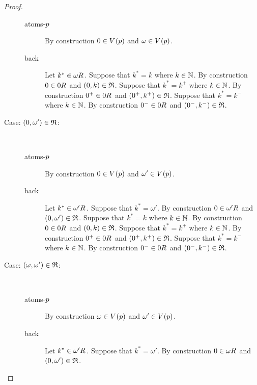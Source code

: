 \begin{proof}
\begin{description}
\begin{description}
            \item[atoms-$p$]
                By construction $0 \in \kValuation(\atomP)$ and $\omega \in \kValuation(\atomP)$.
            \item[back]
                Let $k^* \in \kSuccessors{}{\omega}$.
                Suppose that $k^* = k$ where $k \in \mathbb{N}$.
                By construction $0 \in \kSuccessors{}{0}$ and $(0, k) \in \mathfrak{R}$.
                Suppose that $k^* = k^+$ where $k \in \mathbb{N}$.
                By construction $0^+ \in \kSuccessors{}{0}$ and $(0^+, k^+) \in \mathfrak{R}$.
                Suppose that $k^* = k^-$ where $k \in \mathbb{N}$.
                By construction $0^- \in \kSuccessors{}{0}$ and $(0^-, k^-) \in \mathfrak{R}$.
        \end{description}
    \item[Case: $(0, \omega') \in \mathfrak{R}$:]\hfill\\
        \begin{description}
            \item[atoms-$p$]
                By construction $0 \in \kValuation(\atomP)$ and $\omega' \in \kValuation(\atomP)$.
            \item[back]
                Let $k^* \in \kSuccessors{}{\omega'}$.
                Suppose that $k^* = \omega'$.
                By construction $0 \in \kSuccessors{}{\omega'}$ and $(0, \omega') \in \mathfrak{R}$.
                Suppose that $k^* = k$ where $k \in \mathbb{N}$.
                By construction $0 \in \kSuccessors{}{0}$ and $(0, k) \in \mathfrak{R}$.
                Suppose that $k^* = k^+$ where $k \in \mathbb{N}$.
                By construction $0^+ \in \kSuccessors{}{0}$ and $(0^+, k^+) \in \mathfrak{R}$.
                Suppose that $k^* = k^-$ where $k \in \mathbb{N}$.
                By construction $0^- \in \kSuccessors{}{0}$ and $(0^-, k^-) \in \mathfrak{R}$.
        \end{description}
    \item[Case: $(\omega, \omega') \in \mathfrak{R}$:]\hfill\\
        \begin{description}
            \item[atoms-$p$]
                By construction $\omega \in \kValuation(\atomP)$ and $\omega' \in \kValuation(\atomP)$.
            \item[back]
                Let $k^* \in \kSuccessors{}{\omega'}$.
                Suppose that $k^* = \omega'$.
                By construction $0 \in \kSuccessors{}{\omega}$ and $(0, \omega') \in \mathfrak{R}$.

\end{description}
\end{description}
\end{proof}
